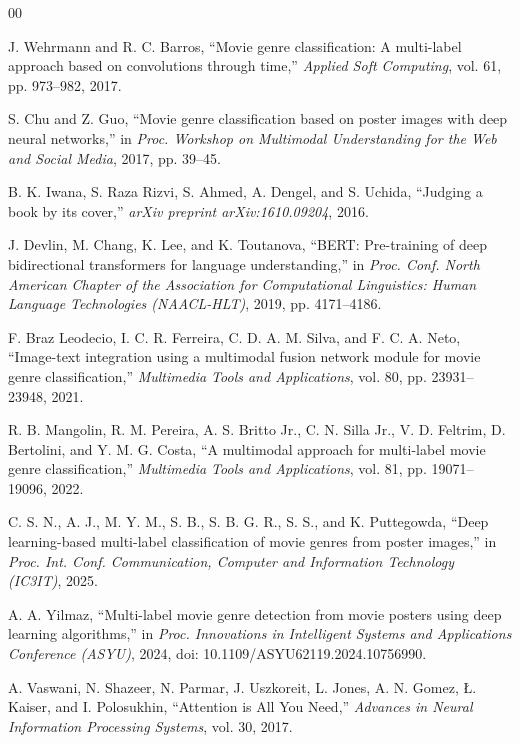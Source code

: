 \documentclass[conference]{IEEEtran}
\begin{document}
\begin{thebibliography}{00}

J. Wehrmann and R. C. Barros,
``Movie genre classification: A multi-label approach based on convolutions through time,''
\textit{Applied Soft Computing}, vol. 61, pp. 973--982, 2017.

S. Chu and Z. Guo,
``Movie genre classification based on poster images with deep neural networks,''
in \textit{Proc. Workshop on Multimodal Understanding for the Web and Social Media},
2017, pp. 39--45.

B. K. Iwana, S. Raza Rizvi, S. Ahmed, A. Dengel, and S. Uchida,
``Judging a book by its cover,''
\textit{arXiv preprint arXiv:1610.09204}, 2016.

J. Devlin, M. Chang, K. Lee, and K. Toutanova,
``BERT: Pre-training of deep bidirectional transformers for language understanding,''
in \textit{Proc. Conf. North American Chapter of the Association for Computational Linguistics: Human Language Technologies (NAACL-HLT)},
2019, pp. 4171--4186.

F. Braz Leodecio, I. C. R. Ferreira, C. D. A. M. Silva, and F. C. A. Neto,
``Image-text integration using a multimodal fusion network module for movie genre classification,''
\textit{Multimedia Tools and Applications}, vol. 80, pp. 23931--23948, 2021.

R. B. Mangolin, R. M. Pereira, A. S. Britto Jr., C. N. Silla Jr., V. D. Feltrim, D. Bertolini, and Y. M. G. Costa,
``A multimodal approach for multi-label movie genre classification,''
\textit{Multimedia Tools and Applications}, vol. 81, pp. 19071--19096, 2022.

C. S. N., A. J., M. Y. M., S. B., S. B. G. R., S. S., and K. Puttegowda,
``Deep learning-based multi-label classification of movie genres from poster images,''
in \textit{Proc. Int. Conf. Communication, Computer and Information Technology (IC3IT)},
2025.

A. A. Yilmaz,
``Multi-label movie genre detection from movie posters using deep learning algorithms,''
in \textit{Proc. Innovations in Intelligent Systems and Applications Conference (ASYU)},
2024, doi: 10.1109/ASYU62119.2024.10756990.

A. Vaswani, N. Shazeer, N. Parmar, J. Uszkoreit, L. Jones, A. N. Gomez, \L{}. Kaiser, and I. Polosukhin,
``Attention is All You Need,''
\textit{Advances in Neural Information Processing Systems}, vol. 30, 2017.


\end{thebibliography}
\end{document}
